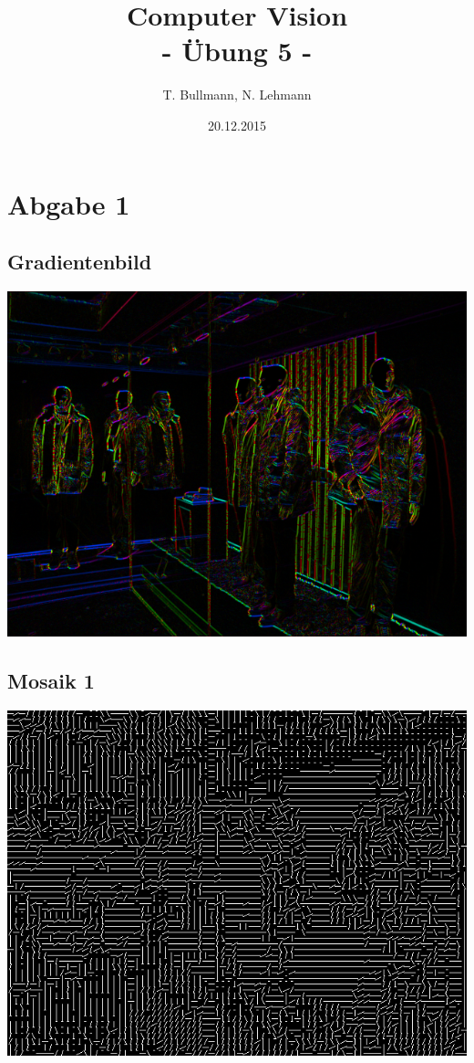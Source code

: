 \documentclass[12pt]{article}
\title{Computer Vision\\- \"Ubung 5 -}
\author{T. Bullmann, N. Lehmann}
\date{20.12.2015}
\begin{document}
\maketitle
\tableofcontents
\newpage

\section{Abgabe 1}

\subsection{Gradientenbild}

\includegraphics[scale=0.6]{gradients.png}

\subsection{Mosaik 1}

\includegraphics[scale=0.6]{cells.png}
\end{document}
